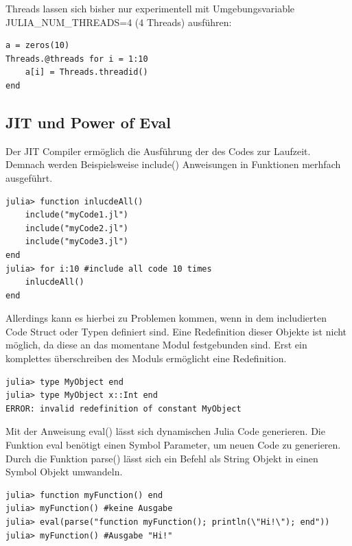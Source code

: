 \documentclass[11pt]{article}
\begin{document}
\noindent\begin{minipage}{\textwidth}
Threads lassen sich bisher nur experimentell mit
Umgebungsvariable JULIA\_NUM\_THREADS=4 (4 Threads) ausführen:
\begin{lstlisting}
a = zeros(10)
Threads.@threads for i = 1:10
	a[i] = Threads.threadid()
end
\end{lstlisting}
\end{minipage}

\subsection{JIT und Power of Eval}
\noindent\begin{minipage}{\textwidth}
Der JIT Compiler ermöglich die Ausführung der des Codes zur Laufzeit. Demnach werden Beispielsweise include() Anweisungen in Funktionen merhfach ausgeführt.

\begin{lstlisting}
julia> function inlucdeAll()
	include("myCode1.jl")
	include("myCode2.jl")
	include("myCode3.jl")
end
julia> for i:10 #include all code 10 times
	inlucdeAll()
end
\end{lstlisting}
\end{minipage}

\noindent\begin{minipage}{\textwidth}
Allerdings kann es hierbei zu Problemen kommen, wenn in dem includierten Code Struct oder Typen definiert sind. Eine Redefinition dieser Objekte ist nicht möglich, da diese an das momentane Modul festgebunden  sind. Erst ein komplettes überschreiben des Moduls ermöglicht eine Redefinition.
\begin{lstlisting}
julia> type MyObject end
julia> type MyObject x::Int end
ERROR: invalid redefinition of constant MyObject
\end{lstlisting}
\end{minipage}

\noindent\begin{minipage}{\textwidth}
Mit der Anweisung eval() lässt sich dynamischen Julia Code generieren. Die Funktion eval benötigt einen Symbol Parameter, um neuen Code zu generieren. Durch die Funktion parse() lässt sich ein Befehl als String Objekt in einen Symbol Objekt umwandeln.
\begin{lstlisting}
julia> function myFunction() end
julia> myFunction() #keine Ausgabe
julia> eval(parse("function myFunction(); println(\"Hi!\"); end"))
julia> myFunction() #Ausgabe "Hi!"
\end{lstlisting}
\end{minipage}
\end{document}
